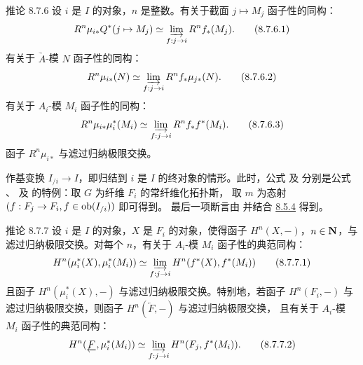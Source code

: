\begin{enonce*}{推论 8.7.6}
设 $i$ 是 $I$ 的对象，$n$ 是整数。有关于截面 $j\mapsto M_j$ 函子性的同构：
\begin{equation*}
R^n \mu_{i\ast} Q^{\ast} (j \mapsto M_j) \simeq \varinjlim_{f :
  j \to i} R^n f_{\ast} (M_j){\quoi}.\tag{8.7.6.1}
\end{equation*}
有关于 $\underrightarrow{A}$-模 $N$ 函子性的同构：
\begin{equation*}
R^n \mu_{i\ast} (N) \simeq \varinjlim_{f:j\to i}
R^n f_{\ast} \mu_{j\ast} (N){\quoi}.\tag{8.7.6.2}
\end{equation*}
有关于 $A_i$-模 $M_i$ 函子性的同构：
\begin{equation*}
R^n \mu_{i\ast} \mu^{\ast}_i (M_i) \simeq \varinjlim_{f:j\to i}
R^n f_{\ast} f^{\ast} (M_i){\quoi}.\tag{8.7.6.3}
\end{equation*}
函子 $R^n\mu_{i\ast}$ 与滤过归纳极限交换。
\end{enonce*}

作基变换 $I_{/i}\to I$，即归结到 $i$ 是 $I$ 的终对象的情形。此时，公式
 及  分别是公式
、 及
 的特例：取 $G$ 为纤维 $F_i$ 的常纤维化拓扑斯，
取 $m$ 为态射 $(f:F_j\to F_i, f\in\ob(I_{/i}))$ 即可得到。
最后一项断言由  并结合 \hyperref[VI.cor8.5.4]{8.5.4} 得到。

\begin{enonce*}{推论 8.7.7}
设\pageoriginale{} $i$ 是 $I$ 的对象，$X$ 是 $F_i$ 的对象，使得函子
$H^n(X,-)$，$n\in\mathbf{N}$，与滤过归纳极限交换。对每个 $n$，有关于 $A_i$-模 $M_i$ 函子性的典范同构：
\begin{equation*}
H^n (\mu_{i}^{\ast}(X), \mu^{\ast}_i (M_i)) \simeq \varinjlim_{f:j\to i}
H^n (f^{\ast} (X), f^{\ast} (M_i))\tag{8.7.7.1}
\end{equation*}
且函子 $H^n(\mu_i^{\ast}(X),-)$ 与滤过归纳极限交换。特别地，若函子
$H^n(F_i,-)$ 与滤过归纳极限交换，则函子 $H^n(\underleftarrow{F},-)$ 与滤过归纳极限交换，
且有关于 $A_i$-模 $M_i$ 函子性的典范同构：
\begin{equation*}
H^n (\underleftarrow{F}, \mu_{i}^{\ast} (M_i)) \simeq \varinjlim_{f:j\to i}
H^n (F_j, f^{\ast} (M_i)){\quoi}.\tag{8.7.7.2}
\end{equation*}
\end{enonce*}

